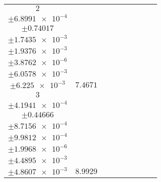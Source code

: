 \documentclass[8pt]{article}
\begin{document}
\begin{longtable}[l]{c c c c c c c c c}
$\num{2}$ & \begin{tabular}[c]{@{}c@{}}$\num{4.0523e-2}$ \\ $\pm\num{6.8991e-4}$\end{tabular} & \begin{tabular}[c]{@{}c@{}}$\num{0.48893}$ \\ $\pm\num{0.74017}$\end{tabular} & \begin{tabular}[c]{@{}c@{}}$\num{-4.335}$ \\ $\pm\num{1.7435e-3}$\end{tabular} & \begin{tabular}[c]{@{}c@{}}$\num{4.0407e+3}$ \\ $\pm\num{1.9376e-3}$\end{tabular} & \begin{tabular}[c]{@{}c@{}}$\num{8.0836}$ \\ $\pm\num{3.8762e-6}$\end{tabular} & \begin{tabular}[c]{@{}c@{}}$\num{0.88466}$ \\ $\pm\num{6.0578e-3}$\end{tabular} & \begin{tabular}[c]{@{}c@{}}$\num{0.83335}$ \\ $\pm\num{6.225e-3}$\end{tabular} & $\num{7.4671}$\\
$\num{3}$ & \begin{tabular}[c]{@{}c@{}}$\num{3.765e-2}$ \\ $\pm\num{4.1941e-4}$\end{tabular} & \begin{tabular}[c]{@{}c@{}}$\num{-0.87192}$ \\ $\pm\num{0.44666}$\end{tabular} & \begin{tabular}[c]{@{}c@{}}$\num{-3.5573}$ \\ $\pm\num{8.7156e-4}$\end{tabular} & \begin{tabular}[c]{@{}c@{}}$\num{4.0414e+3}$ \\ $\pm\num{9.9812e-4}$\end{tabular} & \begin{tabular}[c]{@{}c@{}}$\num{8.0851}$ \\ $\pm\num{1.9968e-6}$\end{tabular} & \begin{tabular}[c]{@{}c@{}}$\num{0.66973}$ \\ $\pm\num{4.4895e-3}$\end{tabular} & \begin{tabular}[c]{@{}c@{}}$\num{0.54667}$ \\ $\pm\num{4.8607e-3}$\end{tabular} & $\num{8.9929}$\\

\end{longtable}
\end{document}
